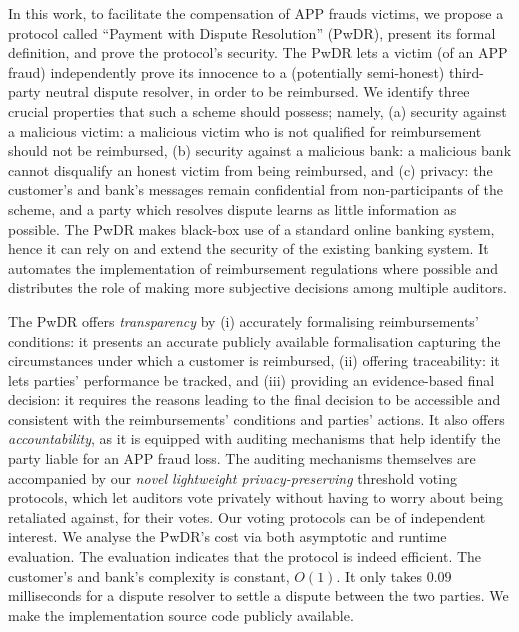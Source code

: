  In this work, to facilitate the compensation of   APP frauds victims, we propose a protocol called ``Payment with Dispute Resolution'' (PwDR), present its formal definition,  and prove the protocol's security.  The PwDR lets a victim (of an APP fraud)  independently prove its innocence to a  (potentially semi-honest) third-party neutral dispute resolver, in order to be reimbursed.  We identify three crucial properties that such a scheme should possess; namely, (a) security against a malicious victim: a malicious victim who is not qualified for reimbursement should not be reimbursed, (b) security against a malicious bank: a malicious bank cannot disqualify an honest victim from being reimbursed, and (c) privacy: the customer’s and bank’s messages remain confidential from non-participants of the scheme, and a party which resolves dispute learns as little information as possible.  The PwDR makes black-box use of a standard online banking system, hence it can rely on and extend the security of the existing banking system. %
%
   It automates the implementation of reimbursement regulations where possible and distributes the role of making more subjective decisions among multiple auditors. %


  The PwDR offers \emph{transparency} by (i) accurately formalising reimbursements' conditions: it presents an accurate publicly available formalisation capturing the circumstances under which a customer is reimbursed,  (ii) offering traceability:  it lets parties'  performance be tracked, and (iii) providing an evidence-based final decision: it requires the reasons leading to the final decision to be accessible and consistent with the reimbursements' conditions and parties' actions.  It also offers \emph{accountability}, as it is equipped with auditing mechanisms that help identify the party liable for an APP fraud loss.  The auditing mechanisms themselves are accompanied by our \emph{novel lightweight privacy-preserving} threshold voting protocols, which let auditors vote privately without having to worry about being retaliated against,  for their votes. Our voting protocols can be of independent interest.   We analyse the PwDR's cost via both asymptotic and runtime evaluation. The evaluation indicates that the protocol is indeed efficient. The customer's and bank's complexity is constant, $O(1)$. It only takes $0.09$ milliseconds for a dispute resolver to settle a dispute between the two parties. We make the implementation source code publicly available. %

